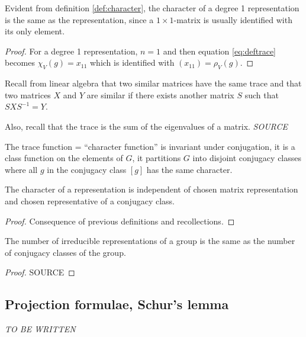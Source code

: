 	\begin{corollary}\label{cor:chardeg1}
		Evident from definition \ref{def:character}, the character of a degree 1 representation is the same as the representation, since a $1 \times 1$-matrix is usually identified with its only element.
	\end{corollary}
	\begin{proof}
		For a degree 1 representation, $n=1$ and then equation \ref{eq:deftrace} becomes $\chi_V(g) = x_{11}$ which is identified with $(x_{11}) = \rho_V(g)$.
	\end{proof}
	
	Recall from linear algebra that two similar matrices have the same trace \cite[Thm 5.4.]{Holst} and that two matrices $X$ and $Y$ are similar if there exists another matrix $S$ such that $SXS^{-1} = Y$. 
	
	Also, recall that the trace is the sum of the eigenvalues of a matrix. \textit{SOURCE}
	
	\begin{lemma}
		The trace function = ``character function'' is invariant under conjugation, it is a class function on the elements of $G$, it partitions $G$ into disjoint conjugacy classes where all $g$ in the conjugacy class $[g]$ has the same character.
	\end{lemma}
	
	\begin{theorem}
		The character of a representation is independent of chosen matrix representation and chosen representative of a conjugacy class.
	\end{theorem}
	\begin{proof}
		Consequence of previous definitions and recollections.
	\end{proof}
	
	\begin{theorem}\label{thm:numberirrep}
		The number of irreducible representations of a group is the same as the number of conjugacy classes of the group.
	\end{theorem}
	\begin{proof}
		SOURCE
	\end{proof}
	
	\subsection{Projection formulae, Schur's lemma}
	
	\textit{TO BE WRITTEN}
	
